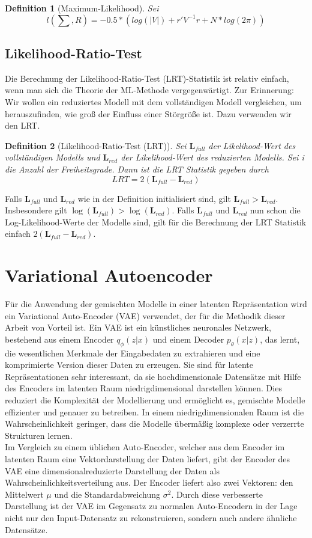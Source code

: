 \documentclass[%
thesis=student,%
coverpage=false,%
titlepage=false,%
headmarks=true, %
german,%
font=libertine, %
math=newpxtx, %
BCOR=5mm,%
coverBCOR=11mm%
]{tumbook}
\theoremstyle{break}
\newtheorem{definition}{Definition}[section]
\begin{document}
\begin{definition}[Maximum-Likelihood]
	Sei 
	$$ l(\sum,R) = -0.5 * (log(|V|)+ r'V^{-1}r + N * log(2\pi))$$
\end{definition}\noindent
\subsection{Likelihood-Ratio-Test}
Die Berechnung der Likelihood-Ratio-Test (LRT)-Statistik ist relativ einfach, wenn man sich die Theorie der ML-Methode vergegenwärtigt. Zur Erinnerung: Wir wollen ein reduziertes Modell mit dem vollständigen Modell vergleichen, um herauszufinden, wie groß der Einfluss einer Störgröße ist. Dazu verwenden wir den LRT. 
\begin{definition}[Likelihood-Ratio-Test (LRT)] 
	Sei $\mathbf{L}_{full}$ der Likelihood-Wert des vollständigen Modells und $\mathbf{L}_{red}$ der Likelihood-Wert des reduzierten Modells. Sei i die Anzahl der Freiheitsgrade. Dann ist die LRT Statistik gegeben durch 
	$$ LRT = 2(\mathbf{L}_{full}- \mathbf{L}_{red}) $$ 
\end{definition} \noindent
Falls $\mathbf{L}_{full}$ und $\mathbf{L}_{red}$ wie in der Definition initialisiert sind, gilt $\mathbf{L}_{full} > \mathbf{L}_{red}$. Insbesondere gilt $\log(\mathbf{L}_{full}) > \log(\mathbf{L}_{red})$.
Falls $\mathbf{L}_{full}$ und $\mathbf{L}_{red}$ nun schon die Log-Likelihood-Werte der Modelle sind, gilt für die Berechnung der LRT Statistik einfach $2(\mathbf{L}_{full} - \mathbf{L}_{red})$. \\
\section{Variational Autoencoder}
Für die Anwendung der gemischten Modelle in einer latenten Repräsentation wird ein Variational Auto-Encoder (VAE) verwendet, der für die Methodik dieser Arbeit von Vorteil ist. 
Ein VAE ist ein künstliches neuronales Netzwerk, bestehend aus einem Encoder $q_\phi(z|x)$ und einem Decoder $p_\theta(x|z)$, das lernt, die wesentlichen Merkmale der Eingabedaten zu extrahieren und eine komprimierte Version dieser Daten zu erzeugen. Sie sind für latente Repräsentationen sehr interessant, da sie hochdimensionale Datensätze mit Hilfe des Encoders im latenten Raum niedrigdimensional darstellen können. Dies reduziert die Komplexität der Modellierung und ermöglicht es, gemischte Modelle effizienter und genauer zu betreiben. In einem niedrigdimensionalen Raum ist die Wahrscheinlichkeit geringer, dass die Modelle übermäßig komplexe oder verzerrte Strukturen lernen.\\ 
Im Vergleich zu einem üblichen Auto-Encoder, welcher aus dem Encoder im latenten Raum eine Vektordarstellung der Daten liefert, gibt der Encoder des VAE eine dimensionalreduzierte Darstellung der Daten als Wahrscheinlichkeitsverteilung aus. Der Encoder liefert also zwei Vektoren: den Mittelwert $\mu$ und die Standardabweichung $\sigma^2$. Durch diese verbesserte Darstellung ist der VAE im Gegensatz zu normalen Auto-Encodern in der Lage nicht nur den Input-Datensatz zu rekonstruieren, sondern auch andere ähnliche Datensätze.\\
\\
\end{document}
